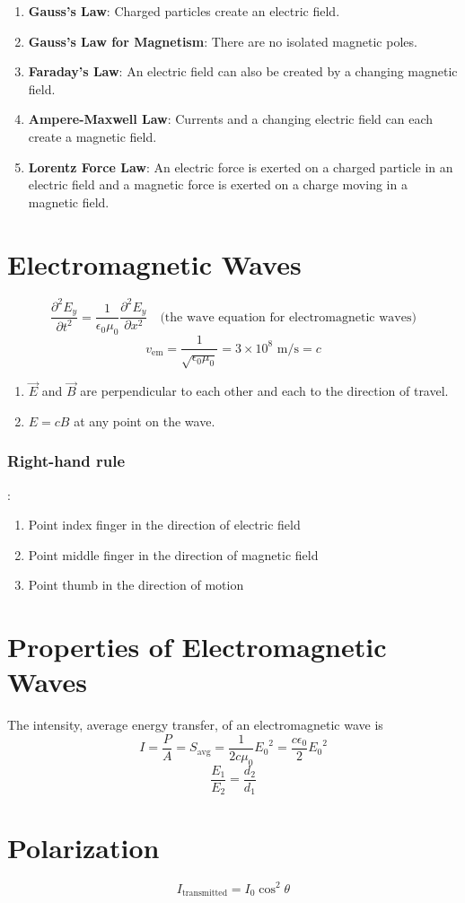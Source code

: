 \documentclass{article}
\begin{document}
\begin{enumerate}
    \item \textbf{Gauss's Law}: Charged particles create an electric field.
    \item \textbf{Gauss's Law for Magnetism}: There are no isolated magnetic poles.
    \item \textbf{Faraday's Law}: An electric field can also be created by a changing magnetic
    field.
    \item \textbf{Ampere-Maxwell Law}: Currents and a changing electric field can each create a
    magnetic field.
    \item \textbf{Lorentz Force Law}: An electric force is exerted on a charged particle in an
    electric field and a magnetic force is exerted on a charge moving in a magnetic field.
\end{enumerate}

\section*{Electromagnetic Waves}
\[\frac{\partial^2 E_y}{\partial t^2}=\frac{1}{\epsilon_0 \mu_0} \frac{\partial^2 E_y}
{\partial x^2}\quad\text{(the wave equation for electromagnetic waves)}\]
\[v_\text{em}=\frac{1}{\sqrt{\epsilon_0 \mu_0}} = 3\times 10^8 \text{ m/s} = c\]

\begin{enumerate}
    \item $\vec{E}$ and $\vec{B}$ are perpendicular to each other and each to the direction of
    travel.
    \item $E=cB$ at any point on the wave.
\end{enumerate}

\subsubsection*{Right-hand rule}:
\begin{enumerate}
    \item Point index finger in the direction of electric field
    \item Point middle finger in the direction of magnetic field
    \item Point thumb in the direction of motion
\end{enumerate}

\section*{Properties of Electromagnetic Waves}
The intensity, average energy transfer, of an electromagnetic wave is
\[I=\frac{P}{A}=S_\text{avg}=\frac{1}{2c\mu_0}{E_0}^2 = \frac{c\epsilon_0}{2}{E_0}^2\]
\[\frac{E_1}{E_2}=\frac{d_2}{d_1}\]

\section*{Polarization}
\[I_\text{transmitted}=I_0 \cos^2 \theta\]
\end{document}
